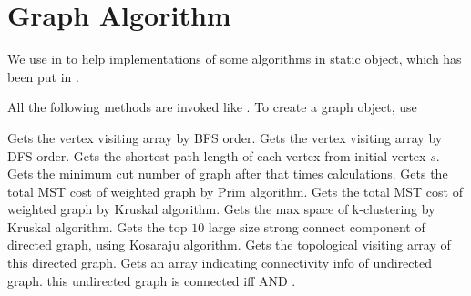 \section{Graph Algorithm}
We use  in  to help implementations of some algorithms in  static object, which has been put in .

All the following methods are invoked like . To create a graph object, use  

Gets the vertex visiting array by BFS order.
Gets the vertex visiting array by DFS order.
Gets the shortest path length of each vertex from initial vertex $s$.
Gets the minimum cut number of graph after that times calculations.
Gets the total MST cost of weighted graph by Prim algorithm.
Gets the total MST cost of weighted graph by Kruskal algorithm.
Gets the max space of k-clustering by Kruskal algorithm.
Gets the top $10$ large size strong connect component of directed graph, using Kosaraju algorithm.
Gets the topological visiting array of this directed graph.
Gets an array indicating connectivity info of undirected graph. this undirected graph is connected iff   AND .
